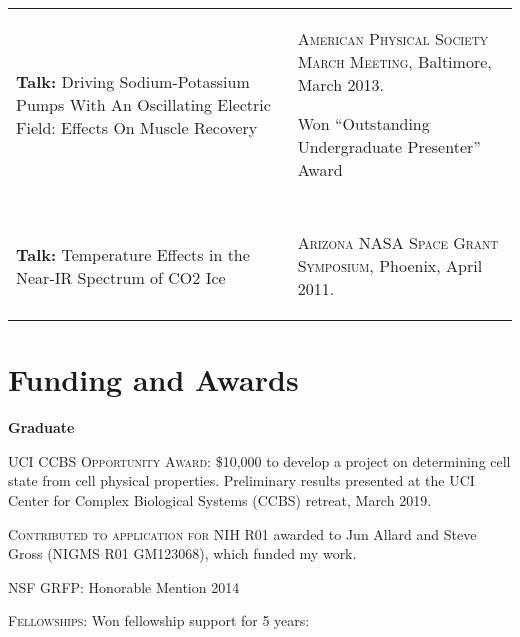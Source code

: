 \documentclass[letterpaper,10pt]{article} %
\makeatletter
\newcommand\cellwidth{\TX@col@width}
\makeatother
\begin{document}
\begin{tabularx}{\textwidth}{p{} | X}
\begin{minipage}{.4\textwidth}
\textbf{Talk:} Driving Sodium-Potassium Pumps With An Oscillating Electric Field: Effects On Muscle Recovery
\end{minipage}
&
\begin{minipage}{\cellwidth}
\begin{description}[itemsep=.25ex,labelsep=0em]
\item \textsc{American Physical Society March Meeting}, Baltimore, March 2013.
\item Won ``Outstanding Undergraduate Presenter'' Award
\end{description}
\end{minipage} \\

\multicolumn{2}{c}{} \\
\multicolumn{2}{c}{} \\

\begin{minipage}{.4\textwidth}
\textbf{Talk:} Temperature Effects in the Near-IR Spectrum of CO2 Ice
\end{minipage}
&
\begin{minipage}{\cellwidth}
\begin{description}[itemsep=.25ex,labelsep=0em]
\item \textsc{Arizona NASA Space Grant Symposium}, Phoenix, April 2011.
\end{description}
\end{minipage}
\end{tabularx}

\bigskip
\section*{Funding and Awards}
\bigskip

{\large \textbf{Graduate}}

\begin{description}[itemsep=-1ex]
\item \textsc{UCI CCBS Opportunity Award}: \$10,000 to develop a project on determining cell state from cell physical properties. Preliminary results presented at the UCI Center for Complex Biological Systems (CCBS) retreat, March 2019.
\item \textsc{Contributed to application for NIH R01} awarded to Jun Allard and Steve Gross (NIGMS R01 GM123068), which funded my work.
\item \textsc{NSF GRFP}: Honorable Mention 2014
\item \textsc{Fellowships}: Won fellowship support for 5 years:
\end{description}
\end{document}
